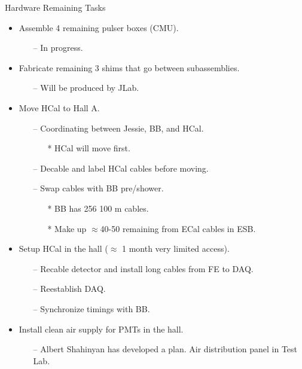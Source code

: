 \documentclass[10pt]{beamer}
\begin{document}
\begin{frame}{Hardware Remaining Tasks}

	\begin{itemize}
        \item Assemble 4 remaining pulser boxes (CMU). 
        		\begin{itemize}
        			\item[--] \alert{In progress.}
        		\end{itemize}
        \item Fabricate remaining 3 shims that go between subassemblies. 
            \begin{itemize}
        			\item[--] \alert{Will be produced by JLab.}
        		\end{itemize}
        	\item Move HCal to Hall A.
        		\begin{itemize}
        			\item[--] \alert{Coordinating between Jessie, BB, and HCal.}
        				\begin{itemize}
        					\item[*] HCal will move first.
        				\end{itemize}
        			\item[--] \alert{Decable and label HCal cables before moving.}
        			\item[--] \alert{Swap cables with BB pre/shower.}
        				\begin{itemize}
        					\item[*] BB has 256 100 m cables. 
        					\item[*] Make up $\approx$40-50 remaining from ECal cables in ESB.
        				\end{itemize}
        		\end{itemize}
        \item Setup HCal in the hall ($\approx$ 1 month very limited access).
            \begin{itemize}
            	    \item[--] \alert{Recable detector and install long cables from FE to DAQ.}
                \item[--] \alert{Reestablish DAQ.}
                \item[--] \alert{Synchronize timings with BB.}
            \end{itemize}
        \item Install clean air supply for PMTs in the hall. 
            \begin{itemize}
        			\item[--] \alert{Albert Shahinyan has developed a plan. Air distribution panel in Test Lab.}
        		\end{itemize}
    \end{itemize}

\end{frame}
\end{document}
